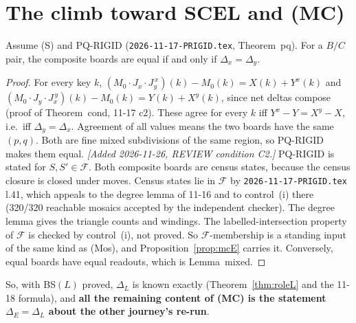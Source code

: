 \documentclass[11pt]{article}
\theoremstyle{definition}\newtheorem{definition}[theorem]{Definition}\newtheorem{remark}[theorem]{Remark}
\begin{document}
\section{The climb toward SCEL and (MC)}\label{sec:climb}
\begin{proposition}\label{prop:mcE}
Assume (S) and PQ-RIGID (\texttt{2026-11-17-PRIGID.tex}, Theorem~pq). For a $B/C$ pair, the composite boards are equal if and only if $\Delta_x=\Delta_y$.
\end{proposition}
\begin{proof}
For every key $k$, $(M_0\cdot J_x\cdot J_y^{\,x})(k)-M_0(k)=X(k)+Y^x(k)$ and $(M_0\cdot J_y\cdot J_x^{\,y})(k)-M_0(k)=Y(k)+X^y(k)$, since net deltas compose (proof of Theorem~cond, 11-17 c2). These agree for every $k$ iff $Y^x-Y=X^y-X$, i.e.\ iff $\Delta_y=\Delta_x$. Agreement of all values means the two boards have the same $(p,q)$. Both are fine mixed subdivisions of the same region, so PQ-RIGID makes them equal. \emph{[Added 2026-11-26, REVIEW condition C2.]} PQ-RIGID is stated for $S,S'\in\mathcal F$. Both composite boards are census states, because the census closure is closed under moves. Census states lie in $\mathcal F$ by \texttt{2026-11-17-PRIGID.tex} l.41, which appeals to the degree lemma of 11-16 and to control~(i) there (320/320 reachable mosaics accepted by the independent checker). The degree lemma gives the triangle counts and windings. The labelled-intersection property of $\mathcal F$ is checked by control~(i), not proved. So $\mathcal F$-membership is a standing input of the same kind as (Mos), and Proposition~\ref{prop:mcE} carries it. Conversely, equal boards have equal readouts, which is Lemma~mixed.
\end{proof}
\noindent So, with BS$(L)$ proved, $\Delta_L$ is known exactly (Theorem~\ref{thm:roleL} and the 11-18 formula), and \textbf{all the remaining content of (MC) is the statement $\Delta_E=\Delta_L$ about the other journey's re-run}.
\end{document}
